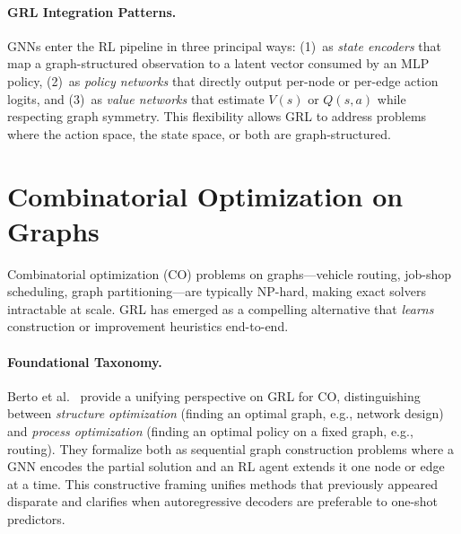 \documentclass{article}
\begin{document}
\paragraph{GRL Integration Patterns.}
GNNs enter the RL pipeline in three principal ways: (1)~as \emph{state encoders} that map a graph-structured observation to a latent vector consumed by an MLP policy, (2)~as \emph{policy networks} that directly output per-node or per-edge action logits, and (3)~as \emph{value networks} that estimate $V(s)$ or $Q(s,a)$ while respecting graph symmetry. This flexibility allows GRL to address problems where the action space, the state space, or both are graph-structured.

\section{Combinatorial Optimization on Graphs}\label{sec:co}

Combinatorial optimization (CO) problems on graphs---vehicle routing, job-shop scheduling, graph partitioning---are typically NP-hard, making exact solvers intractable at scale. GRL has emerged as a compelling alternative that \emph{learns} construction or improvement heuristics end-to-end.

\paragraph{Foundational Taxonomy.}
Berto et al.~\cite{berto2024grl_co} provide a unifying perspective on GRL for CO, distinguishing between \emph{structure optimization} (finding an optimal graph, e.g., network design) and \emph{process optimization} (finding an optimal policy on a fixed graph, e.g., routing). They formalize both as sequential graph construction problems where a GNN encodes the partial solution and an RL agent extends it one node or edge at a time. This constructive framing unifies methods that previously appeared disparate and clarifies when autoregressive decoders are preferable to one-shot predictors.
\end{document}
